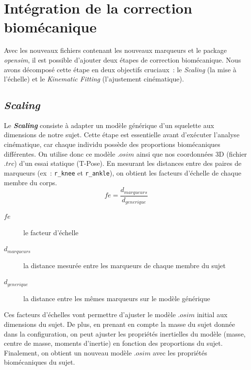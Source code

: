 \section{Intégration de la correction biomécanique}
    Avec les nouveaux fichiers contenant les nouveaux marqueurs et le package \textit{opensim}, il est possible d'ajouter deux étapes de correction biomécanique.  Nous avons décomposé cette étape en deux objectifs cruciaux : le \textit{Scaling} (la mise à l'échelle) et le \textit{Kinematic Fitting} (l'ajustement cinématique).

    \subsection{\textit{\textbf{Scaling}}}
        Le \textit{\textbf{Scaling}} consiste à adapter un modèle générique d'un squelette aux dimensions de notre sujet. Cette étape est essentielle avant d'exécuter l'analyse cinématique, car chaque individu possède des proportions biomécaniques différentes. On utilise donc ce modèle $.osim$ ainsi que nos coordonnées 3D (fichier $.trc$) d'un essai statique (T-Pose). En mesurant les distances entre des paires de marqueurs (ex : \texttt{r\_knee} et \texttt{r\_ankle}), on obtient les facteurs d'échelle de chaque membre du corps.
        \begin{equation}
            fe = \frac{d_{marqueurs}}{d_{generique}}
        \end{equation}
        \begin{description}
            \item[$fe$] le facteur d'échelle
            \item[$d_{marqueurs}$] la distance mesurée entre les marqueurs de chaque membre du sujet
            \item[$d_{generique}$] la distance entre les mêmes marqueurs sur le modèle générique
        \end{description}
        Ces facteurs d'échelles vont permettre d'ajuster le modèle $.osim$ initial aux dimensions du sujet. De plus, en prenant en compte la masse du sujet donnée dans la configuration, on peut ajuster les propriétés inertielles du modèle (masse, centre de masse, moments d'inertie) en fonction des proportions du sujet. Finalement, on obtient un nouveau modèle $.osim$ avec les propriétés biomécaniques du sujet.

